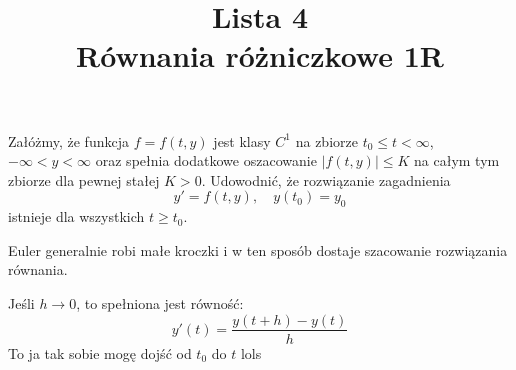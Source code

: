 \documentclass{article}
\title{Lista 4\\{\normalsize Równania różniczkowe 1R}}
\author{}
\date{}
\begin{document}
\maketitle
\thispagestyle{empty}

\begin{problem}{}
Załóżmy, że funkcja $f=f(t,y)$ jest klasy $C^1$ na zbiorze $t_0\leq t<\infty$, $-\infty<y<\infty$ oraz spełnia dodatkowe oszacowanie $|f(t,y)|\leq K$ na całym tym zbiorze dla pewnej stałej $K>0$. Udowodnić, że rozwiązanie zagadnienia
$$y'=f(t,y),\quad y(t_0)=y_0$$
istnieje dla wszystkich $t\geq t_0$.
\end{problem}

Euler generalnie robi małe kroczki i w ten sposób dostaje szacowanie rozwiązania równania.

Jeśli $h\to 0$, to spełniona jest równość:
$$y'(t)=\frac{y(t+h)-y(t)}{h}$$
To ja tak sobie mogę dojść od $t_0$ do $t$ lols
\end{document}
